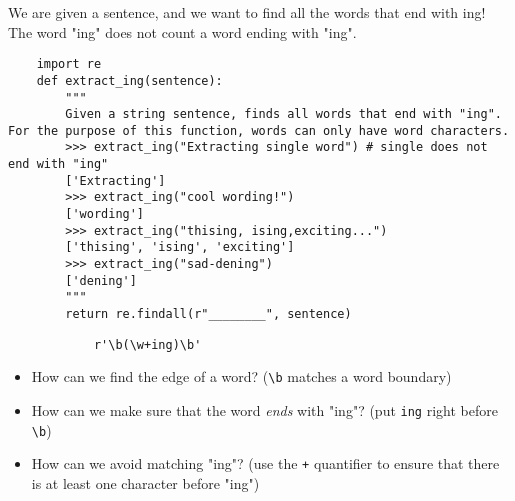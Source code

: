 \begin{blocksection}
    \question We are given a sentence, and we want to find all the words that end with ing! The word "ing" does not count a word ending with "ing". 
    
    \begin{lstlisting}
    import re
    def extract_ing(sentence):
        """
        Given a string sentence, finds all words that end with "ing". For the purpose of this function, words can only have word characters.
        >>> extract_ing("Extracting single word") # single does not end with "ing"
        ['Extracting']
        >>> extract_ing("cool wording!")
        ['wording']
        >>> extract_ing("thising, ising,exciting...")
        ['thising', 'ising', 'exciting']
        >>> extract_ing("sad-dening")
        ['dening']
        """
        return re.findall(r"________", sentence)
    \end{lstlisting}
    
    \begin{solution}[2in]
        \begin{lstlisting}
            r'\b(\w+ing)\b'
        \end{lstlisting}
    \end{solution}
    \end{blocksection}

    \begin{guide}
        \begin{blocksection}
            \begin{itemize}
                \item How can we find the edge of a word? (\lstinline{\b} matches a word boundary)
                \item How can we make sure that the word \textit{ends} with "ing"? (put \lstinline{ing} right before \lstinline{\b})
                \item How can we avoid matching "ing"? (use the \lstinline{+} quantifier to ensure that there is at least one character before "ing")
            \end{itemize}
        \end{blocksection}
    \end{guide}
    
